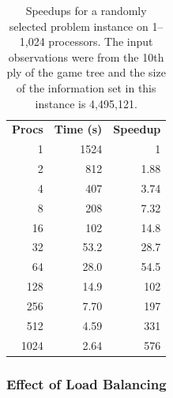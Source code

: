 \documentclass[10pt, conference, compsocconf]{IEEEtran}
\begin{document}
\begin{table}[ht]

\caption{Speedups for a randomly selected problem instance on 1--1,024
processors.  The input observations were from the 10th ply of the game tree and
the size of the information set in this instance is 4,495,121.}
\centering
\begin{tabular}{rrr}
{\bf Procs}	&	{\bf Time (s)} 	&	{\bf Speedup}\\
1	&	1524	&	1\\
2	&	812	&	1.88\\
4	&	407	&	3.74\\
8	&	208	&	7.32\\
16	&	102	&	14.8\\
32	&	53.2	&	28.7\\
64	&	28.0	&	54.5\\
128	&	14.9	&	102\\
256	&	7.70	&	197\\
512	&	4.59	&	331\\
1024	&	2.64	&	576\\
\end{tabular}


\label{speedups}
\end{table}



\subsubsection{Effect of Load Balancing}
\end{document}
